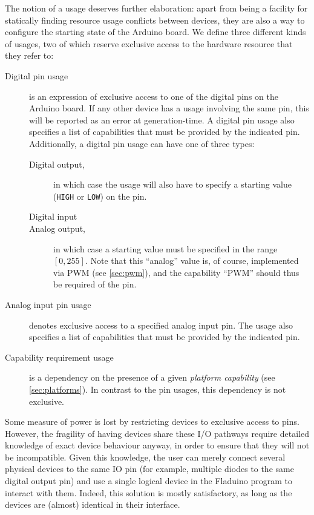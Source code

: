 \documentclass[a4paper, oneside, final]{memoir}
\begin{document}
The notion of a usage deserves further elaboration: apart from being a
facility for statically finding resource usage conflicts between
devices, they are also a way to configure the starting state of the
Arduino board.  We define three different kinds of usages, two of which
reserve exclusive access to the hardware resource that they refer to:

\begin{description}
\item[Digital pin usage] is an expression of exclusive access to one
  of the digital pins on the Arduino board.  If any other device has a
  usage involving the same pin, this will be reported as an error at
  generation-time.  A digital pin usage also specifies a list of
  capabilities that must be provided by the indicated pin.
  Additionally, a digital pin usage can have one of three types:
  \begin{description}
  \item[Digital output,] in which case the usage will also have to
    specify a starting value (\texttt{HIGH} or \texttt{LOW}) on the
    pin.
  \item[Digital input]
  \item[Analog output,] in which case a starting value must be
    specified in the range $[0,255]$.  Note that this ``analog'' value
    is, of course, implemented via PWM (see \ref{sec:pwm}), and the
    capability ``PWM'' should thus be required of the pin.
  \end{description}
\item[Analog input pin usage] denotes exclusive access to a specified
  analog input pin.  The usage also specifies a list of capabilities
  that must be provided by the indicated pin.
\item[Capability requirement usage] is a dependency on the presence of
  a given \textit{platform capability} (see \ref{sec:platforms}).  In
  contrast to the pin usages, this dependency is not exclusive.
\end{description}

Some measure of power is lost by restricting devices to exclusive
access to pins.  However, the fragility of having devices share these
I/O pathways require detailed knowledge of exact device behaviour
anyway, in order to ensure that they will not be incompatible.  Given
this knowledge, the user can merely connect several physical devices
to the same IO pin (for example, multiple diodes to the same digital
output pin) and use a single logical device in the Fladuino program to
interact with them.  Indeed, this solution is mostly satisfactory, as
long as the devices are (almost) identical in their interface.
\end{document}
